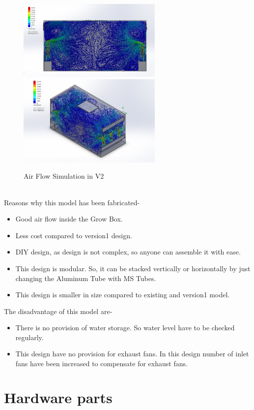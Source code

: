 \documentclass[a4paper,12pt,oneside]{book}
\begin{document}
\begin{figure}[h!]
\includegraphics[width=200pt]{version_2_FV}
\includegraphics[width=200pt]{version_2_ISO}
\caption{Air Flow Simulation in V2}
\end{figure}
\\Reasons why this model has been fabricated-
\begin{itemize}
    \item Good air flow inside the Grow Box.
    \item Less cost compared to version1 design.
    \item DIY design, as design is not complex, so anyone can assemble it with ease.
    \item This design is modular. So, it can be stacked vertically or horizontally by just changing the Aluminum Tube with MS Tubes.
    \item This design is smaller in size compared to existing and version1 model.
\end{itemize}
The disadvantage of this model are- 
\begin{itemize}
\item There is no provision of water storage. So water level have to be checked regularly. 
\item This design have no provision for exhaust fans. In this design number of inlet fans have been increased to compensate for exhaust fans.
\end{itemize}

\section{Hardware parts}
\end{document}
